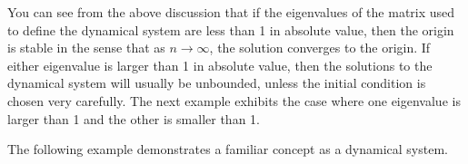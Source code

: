 You can see from the above discussion that if the eigenvalues of the
matrix used to define the dynamical system are less than 1 in absolute
value, then the origin is stable in the sense that as
$n\rightarrow \infty$, the solution converges to the origin. If either
eigenvalue is larger than 1 in absolute value, then the solutions to
the dynamical system will usually be unbounded, unless the initial
condition is chosen very carefully. The next example exhibits the case
where one eigenvalue is larger than 1 and the other is smaller than 1.

The following example demonstrates a familiar concept as a dynamical system.

